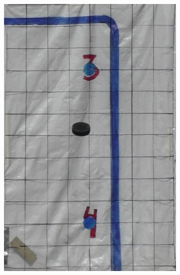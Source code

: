 \documentclass[a4paper,12pt]{report}
\begin{document}
\begin{figure}[ht]
  \centering
  \begin{subfigure}[t]{0.24\textwidth}
    \centering
    \includegraphics[width=\linewidth]{photos/skott1.png}
  \end{subfigure}%
  \hspace*{\fill}
  \begin{subfigure}[t]{0.24\textwidth}
    \centering

\end{subfigure}
\end{figure}
\end{document}
